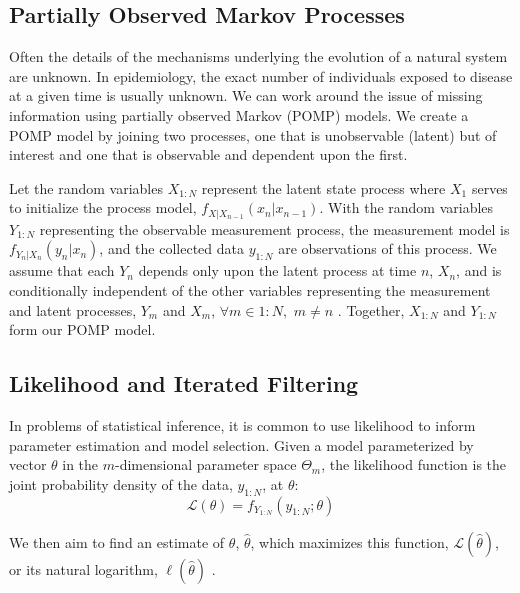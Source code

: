 \documentclass[12pt]{article}
\begin{document}
\subsection{Partially Observed Markov Processes}

 Often the details of the mechanisms underlying the evolution of a natural system are unknown. In epidemiology, the exact number of individuals exposed to disease at a given time is usually unknown. We can work around the issue of missing information using partially observed Markov (POMP) models. We create a POMP model by joining two processes, one that is unobservable (latent) but of interest and one that is observable and dependent upon the first.
  
  Let the random variables $X_{1:N}$ represent the latent state process where $X_1$ serves to initialize the process model, $f_{X|X_{n-1}}(x_n|x_{n-1})$. With the random variables $Y_{1:N}$ representing the observable measurement process, the measurement model is $f_{Y_n|X_n}(y_n|x_n)$, and the collected data $y_{1:N}$ are observations of this process. We assume that each $Y_n$ depends only upon the latent process at time $n$, $X_n$, and is conditionally independent of the other variables representing the measurement and latent processes, $Y_m$ and $X_m$, \hspace{1mm} $\forall m \in 1:N,$ \hspace{1mm} $m \ne n$ \cite{Shumway_ch6}. Together, $X_{1:N}$ and $Y_{1:N}$ form our POMP model.

\subsection{Likelihood and Iterated Filtering}
\label{sec:like}

 In problems of statistical inference, it is common to use likelihood to inform parameter estimation and model selection. Given a model parameterized by vector $\theta$ in the $m$-dimensional parameter space $\Theta_m$, the likelihood function is the joint probability density of the data, $y_{1:N}$, at $\theta$:
        \begin{equation}
        \mathcal{L}(\theta) = f_{Y_{1:N}}(y_{1:N}; \theta)
        \end{equation}
        
  We then aim to find an estimate of $\theta$, $\hat{\theta}$, which maximizes this function, $\mathcal{L}(\hat{\theta})$, or its natural logarithm, $\mathbf{\ell}(\hat{\theta})$ \cite{Millar}. 
  
\end{document}
